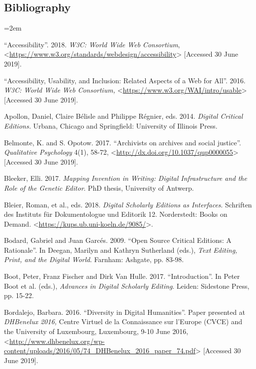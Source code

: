 \begin{paper}
\section*{Bibliography}
\begin{flushleft}
\hangindent=2em

``Accessibility''. 2018. \emph{W3C: World Wide Web Consortium},
\textless{}\href{https://www.w3.org/standards/webdesign/accessibility}{https://www.w3.org/standards/webdesign/accessibility}\textgreater{}
{[}Accessed 30 June 2019{]}.

``Accessibility, Usability, and Inclusion: Related Aspects of a Web for
All''. 2016. \emph{W3C: World Wide Web Consortium,}
\textless{}\href{https://www.w3.org/WAI/intro/usable}{https://www.w3.org/WAI/intro/usable}\textgreater{}
{[}Accessed 30 June 2019{]}.

Apollon, Daniel, Claire Bélisle and Philippe Régnier, eds. 2014.
\emph{Digital Critical Editions.} Urbana, Chicago and Springfield:
University of Illinois Press.

Belmonte, K. and S. Opotow. 2017. ``Archivists on archives and social
justice''. \emph{Qualitative Psychology} 4(1), 58-72,
\textless{}\href{http://dx.doi.org/10.1037/qup0000055}{http://dx.doi.org/10.1037/qup0000055}\textgreater{}
{[}Accessed 30 June 2019{]}.

Bleeker, Elli. 2017. \emph{Mapping Invention in Writing: Digital
Infrastructure and the Role of the Genetic Editor}. PhD thesis,
University of Antwerp.

Bleier, Roman, et al., eds. 2018. \emph{Digital Scholarly Editions as
Interfaces}. Schriften des Instituts für Dokumentologue und Editorik 12.
Norderstedt: Books on Demand. \textless{}\href{https://kups.ub.uni-koeln.de/9085/}{https://kups.ub.uni-koeln.de/9085/}\textgreater{}.

Bodard, Gabriel and Juan Garcés. 2009. ``Open Source Critical Editions:
A Rationale''. In Deegan, Marilyn and Kathryn Sutherland (eds.),
\emph{Text Editing, Print, and the Digital World}. Farnham: Ashgate, pp.
83-98.

Boot, Peter, Franz Fischer and Dirk Van Hulle. 2017. ``Introduction''.
In Peter Boot et al. (eds.), \emph{Advances in Digital Scholarly
Editing}. Leiden: Sidestone Press, pp. 15-22.

Bordalejo, Barbara. 2016. ``Diversity in Digital Humanities''. Paper
presented at \emph{DHBenelux 2016,} Centre Virtuel de la Connaissance
sur l'Europe (CVCE) and the University of Luxembourg, Luxembourg, 9-10
June 2016,
\textless{}\href{http://www.dhbenelux.org/wp-content/uploads/2016/05/74\_DHBenelux\_2016\_paper\_74.pdf}{http://www.dhbenelux.org/wp-content/uploads/2016/05/74\_DHBenelux\_2016\_paper\_74.pdf}\textgreater{}
{[}Accessed 30 June 2019{]}.


\end{flushleft}
\end{paper}
